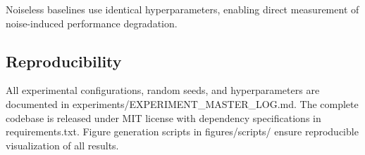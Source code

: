 Noiseless baselines use identical hyperparameters, enabling direct measurement of noise-induced performance degradation.


\subsection{Reproducibility}

All experimental configurations, random seeds, and hyperparameters are documented in experiments/EXPERIMENT\_MASTER\_LOG.md.
The complete codebase is released under MIT license with dependency specifications in requirements.txt.
Figure generation scripts in figures/scripts/ ensure reproducible visualization of all results.

